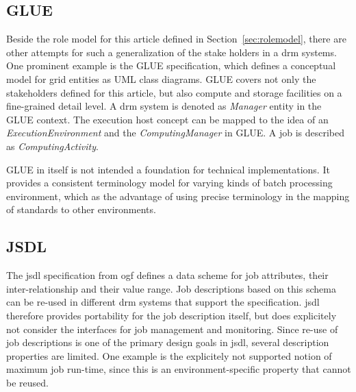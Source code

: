 \documentclass[twocolumn]{svjour3}       %
\begin{document}


\subsection{GLUE}

Beside the role model for this article defined in Section~\ref{sec:rolemodel}, there are other attempts for such a generalization of the stake holders in a \gls{drm} systems. One prominent example is the GLUE specification, which defines a conceptual model for grid entities as UML class diagrams. GLUE covers not only the stakeholders defined for this article, but also compute and storage facilities on a fine-grained detail level. A \gls{drm} system is denoted as \emph{Manager} entity in the GLUE context. The execution host concept can be mapped to the idea of an \emph{ExecutionEnvironment} and the \emph{ComputingManager} in GLUE. A job is described as \emph{ComputingActivity}.


GLUE in itself is not intended a foundation for technical implementations. It provides a consistent terminology model for varying kinds of batch processing environment, which as the advantage of using precise terminology in the mapping of standards to other environments. 

\subsection{JSDL}

The \gls{jsdl} specification from \gls{ogf} defines a data scheme for job attributes, their inter-relationship and their value range. Job descriptions based on this schema can be re-used in different \gls{drm} systems that support the specification. \gls{jsdl} therefore provides portability for the job description itself, but does explicitely not consider the interfaces for job management and monitoring. Since re-use of job descriptions is one of the primary design goals in \gls{jsdl}, several description properties are limited. One example is the explicitely not supported notion of maximum job run-time, since this is an environment-specific property that cannot be reused.
\end{document}
